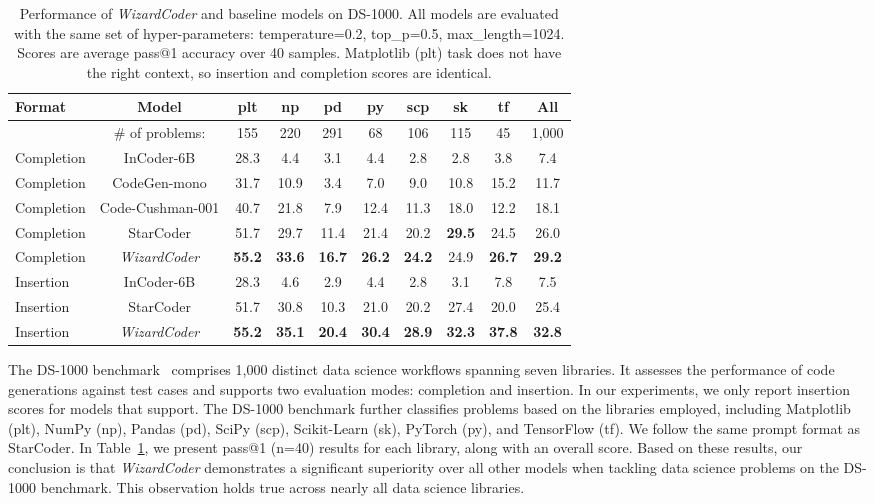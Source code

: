 \documentclass{article}
\newcommand{\modelname}{\emph{WizardCoder}}
\begin{document}
\begin{table}
    \centering
    \caption{Performance of \modelname{} and baseline models on DS-1000. All models are evaluated with the same set of hyper-parameters: temperature=0.2, top\_p=0.5, max\_length=1024. Scores are average pass@1 accuracy over 40 samples. Matplotlib (plt) task does not have the right context, so insertion and completion scores are identical.}
    \begin{tabular}{lccccccccc}
        \toprule
        \textbf{Format} & \textbf{Model} & \textbf{plt} & \textbf{np} & \textbf{pd} & \textbf{py} & \textbf{scp} & \textbf{sk} & \textbf{tf} & \textbf{All}\\
        \midrule
        & \# of problems: & 155 & 220 & 291 & 68 & 106 & 115 & 45 & 1,000\\
        \midrule
        Completion & InCoder-6B & 28.3 & 4.4 & 3.1 & 4.4 & 2.8 & 2.8 & 3.8 & 7.4\\
        Completion & CodeGen-mono & 31.7 & 10.9 & 3.4 & 7.0 & 9.0 & 10.8 & 15.2 & 11.7\\
        Completion & Code-Cushman-001 & 40.7 & 21.8 & 7.9 & 12.4 & 11.3 & 18.0 & 12.2 & 18.1\\
        Completion & StarCoder & 51.7 & 29.7 & 11.4 & 21.4 & 20.2 & \textbf{29.5} & 24.5 & 26.0\\
        Completion & \modelname & \textbf{55.2} & \textbf{33.6} & \textbf{16.7} & \textbf{26.2} & \textbf{24.2} & 24.9 & \textbf{26.7} & \textbf{29.2}\\
        \midrule
        Insertion & InCoder-6B & 28.3 & 4.6 & 2.9 & 4.4 & 2.8 & 3.1 & 7.8 & 7.5\\
        Insertion & StarCoder & 51.7 & 30.8 & 10.3 & 21.0 & 20.2 & 27.4 & 20.0 & 25.4\\
        Insertion & \modelname & \textbf{55.2} & \textbf{35.1} & \textbf{20.4} & \textbf{30.4} & \textbf{28.9} & \textbf{32.3} & \textbf{37.8} & \textbf{32.8}\\
        \bottomrule
    \end{tabular}
    \label{tab:ds}
\end{table} 
The DS-1000 benchmark~\cite{DS1000} comprises 1,000 distinct data science workflows spanning seven libraries. It assesses the performance of code generations against test cases and supports two evaluation modes: completion and insertion. In our experiments, we only report insertion scores for models that support. The DS-1000 benchmark further classifies problems based on the libraries employed, including Matplotlib (plt), NumPy (np), Pandas (pd), SciPy (scp), Scikit-Learn (sk), PyTorch (py), and TensorFlow (tf). We follow the same prompt format as StarCoder. In Table~\ref{tab:ds}, we present pass@1 (n=40) results for each library, along with an overall score. Based on these results, our conclusion is that \modelname{} demonstrates a significant superiority over all other models when tackling data science problems on the DS-1000 benchmark. This observation holds true across nearly all data science libraries.
\end{document}
